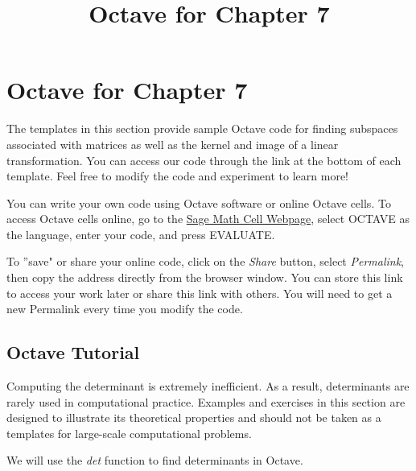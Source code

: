 \documentclass{ximera}
\title{Octave for Chapter 7} \license{CC BY-NC-SA 4.0}
\begin{document}
\begin{abstract}
\end{abstract}
\maketitle

\section*{Octave for Chapter 7}

The templates in this section provide sample Octave code for finding subspaces associated with matrices as well as the kernel and image of a linear transformation. You can access our code through the link at the bottom of each template.  Feel free to modify the code and experiment to learn more!  

You can write your own code using Octave software or online Octave cells.  To access Octave cells online, go to the \href{https://sagecell.sagemath.org/}{Sage Math Cell Webpage}, select OCTAVE as the language, enter your code, and press EVALUATE.  

To ''save" or share your online code, click on the \emph{Share} button, select \emph{Permalink}, then copy the address directly from the browser window.  You can store this link to access your work later or share this link with others.  You will need to get a new Permalink every time you modify the code.

\subsection*{Octave Tutorial}
\begin{warning}
Computing the determinant is extremely inefficient.  As a result, determinants are rarely used in computational practice.  Examples and exercises in this section are designed to illustrate its theoretical properties and should not be taken as a templates for large-scale computational problems.
\end{warning}

We will use the \emph{det} function to find determinants in Octave.
\end{document}
